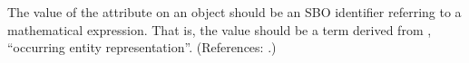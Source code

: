 The value of the attribute  on an \Event object should be
an SBO identifier referring to a mathematical expression.  That is, the
value should be a term derived from \sbointeractionID,
``occurring entity representation''.  (References: .)
